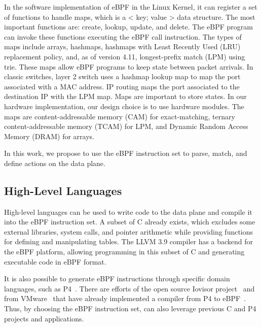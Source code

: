 

In the software implementation of eBPF in the Linux Kernel, it can register a set of functions to handle maps, which is a < key; value > data structure. 
The most important functions are: create, lookup, update, and delete.
The eBPF program can invoke these functions executing the eBPF call instruction.
The types of maps include arrays, hashmaps, hashmaps with Least Recently Used (LRU) replacement policy, and, as of version 4.11, longest-prefix match (LPM) using trie.
These maps allow eBPF programs to keep state between packet arrivals.
In classic switches, layer 2 switch uses a hashmap lookup map to map the port associated with a MAC address.
IP routing maps the port associated to the destination IP with the LPM map.
Maps are important to store states.
In our hardware implementation, our design choice is to use hardware modules. The maps are content-addressable memory (CAM) for exact-matching, ternary content-addressable memory (TCAM) for LPM, and Dynamic Random Access Memory (DRAM) for arrays.


In this work, we propose to use the eBPF instruction set to parse, match, and define actions on the data plane.

\subsection{High-Level Languages}


High-level languages can be used to write code to the data plane and compile it into the eBPF instruction set. A subset of C already exists, which excludes some external libraries, system calls, and pointer arithmetic while providing functions for defining and manipulating tables. The LLVM 3.9 compiler has a backend for the eBPF platform, allowing programming in this subset of C and generating executable code in eBPF format.

It is also possible to generate eBPF instructions through specific domain languages, such as P4~\cite{Bosshart:2014:P4}.
There are efforts of the open source Iovisor project~\cite{IOvisor} and from VMware~\cite{p4c-xdp2018} that have already implemented a compiler from P4 to eBPF~\cite{P42EBPF2015}.
Thus, by choosing the eBPF instruction set, \system can also leverage previous C and P4 projects and applications.



